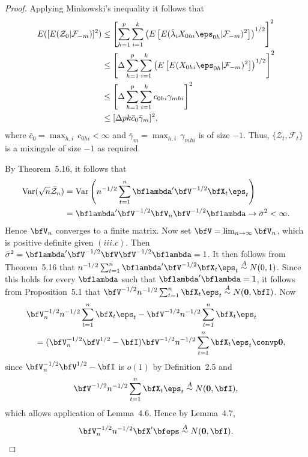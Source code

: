 \begin{proof}
Applying Minkowski's inequality it follows that
\begin{align*}
E([E(\mathcal{Z}_0|\mathcal{F}_{-m})]^2) &\leq \left[\sum_{h=1}^{p}\sum_{i=1}^{k}\left(E\left[E(\tilde{\lambda}_i X_{0hi}\eps_{0h}|\mathcal{F}_{-m})^2\right]\right)^{1/2}\right]^2 \\
&\leq \left[\Delta\sum_{h=1}^{p}\sum_{i=1}^{k}\left(E\left[E(X_{0hi}\eps_{0h}|\mathcal{F}_{-m})^2\right]\right)^{1/2}\right]^2 \\
&\leq \left[\Delta\sum_{h=1}^{p}\sum_{i=1}^{k}c_{0hi}\gamma_{mhi}\right]^2 \\
&\leq [\Delta pk\bar{c}_0\bar{\gamma}_m]^2,
\end{align*}
where $\bar{c}_0 = \max_{h,i}\, c_{0hi} < \infty$ and $\bar{\gamma}_m = \max_{h,i}\,\gamma_{mhi}$ is of size $-1$. Thus, $\{\mathcal{Z}_t, \mathcal{F}_t\}$ is a mixingale of size $-1$ as required.

By Theorem~5.16, it follows that
\begin{align*}
\Var(\sqrt{n}\bar{\mathcal{Z}}_n) &= \Var\left(n^{-1/2}\sum_{t=1}^{n}\bflambda'\bfV^{-1/2}\bfX_t\eps_t\right) \\
&= \bflambda'\bfV^{-1/2}\bfV_n\bfV^{-1/2}\bflambda \to \bar{\sigma}^2 < \infty.
\end{align*}
Hence $\bfV_n$ converges to a finite matrix. Now set $\bfV = \lim_{n \to \infty}\bfV_n$, which is positive definite given $(iii.c)$. Then $\bar{\sigma}^2 = \bflambda'\bfV^{-1/2}\bfV\bfV^{-1/2}\bflambda = 1$. It then follows from Theorem~5.16 that $n^{-1/2}\sum_{t=1}^{n}\bflambda'\bfV^{-1/2}\bfX_t\eps_t \overset{A}{\sim} N(0,1)$. Since this holds for every $\bflambda$ such that $\bflambda'\bflambda = 1$, it follows from Proposition~5.1 that $\bfV^{-1/2}n^{-1/2}\sum_{t=1}^{n}\bfX_t\eps_t \overset{A}{\sim} N(\mathbf{0}, \bfI)$. Now
\begin{align*}
&\bfV_n^{-1/2}n^{-1/2}\sum_{t=1}^{n}\bfX_t\eps_t - \bfV^{-1/2}n^{-1/2}\sum_{t=1}^{n}\bfX_t\eps_t \\
&\quad= (\bfV_n^{-1/2}\bfV^{1/2} - \bfI)\bfV^{-1/2}n^{-1/2}\sum_{t=1}^{n}\bfX_t\eps_t \convp \mathbf{0},
\end{align*}
since $\bfV_n^{-1/2}\bfV^{1/2} - \bfI$ is $o(1)$ by Definition~2.5 and
\[
\bfV^{-1/2}n^{-1/2}\sum_{t=1}^{n}\bfX_t\eps_t \overset{A}{\sim} N(\mathbf{0}, \bfI),
\]
which allows application of Lemma~4.6. Hence by Lemma~4.7,
\[
\bfV_n^{-1/2}n^{-1/2}\bfX'\bfeps \overset{A}{\sim} N(\mathbf{0}, \bfI).
\]


\end{proof}
